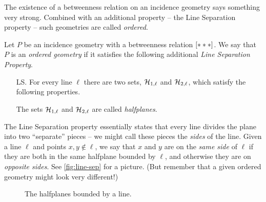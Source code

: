 The existence of a betweenness relation on an incidence geometry says something very strong.
Combined with an additional property -- the Line Separation property -- such geometries are called \emph{ordered}.

\begin{dfn}
Let \(P\) be an incidence geometry with a betweenness relation \([ \ast \ast \ast ]\).
We say that \(P\) is an \emph{ordered geometry} if it satisfies the following additional \emph{Line Separation Property}.
\begin{itemize}
\item[LS.] For every line \(\ell\) there are two sets, \(\mathcal{H}_{1,\ell}\) and \(\mathcal{H}_{2,\ell}\), which satisfy the following properties.
The sets \(\mathcal{H}_{1,\ell}\) and \(\mathcal{H}_{2,\ell}\) are called \emph{halfplanes}.
\end{itemize}
\end{dfn}

The Line Separation property essentially states that every line divides the plane into two ``separate'' pieces -- we might call these pieces the \emph{sides} of the line.
Given a line \(\ell\) and points \(x,y \notin \ell\), we say that \(x\) and \(y\) are on the \emph{same side} of \(\ell\) if they are both in the same halfplane bounded by \(\ell\), and otherwise they are on \emph{opposite sides}.
See \autoref{fig:line-sep} for a picture.
(But remember that a given ordered geometry might look very different!)

\begin{figure}[h]
\begin{center}
\caption{\label{fig:line-sep}The halfplanes bounded by a line.}
\end{center}
\end{figure}


